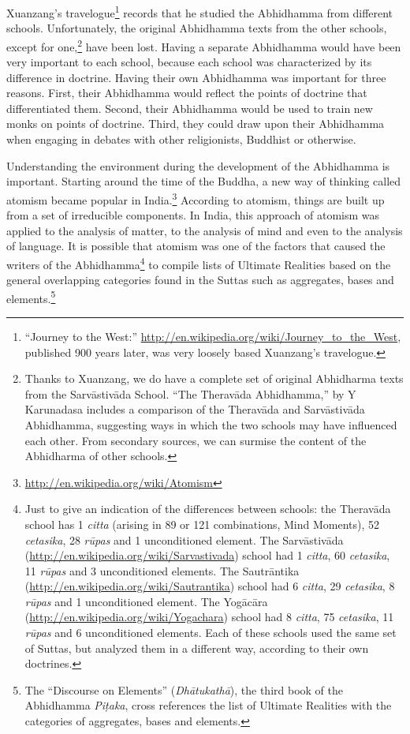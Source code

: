 Xuanzang’s travelogue\footnote{“Journey to the West:” \url{http://en.wikipedia.org/wiki/Journey_to_the_West}, published 900 years later, was very loosely based Xuanzang’s travelogue.} records that he studied the Abhidhamma from different schools. Unfortunately, the original Abhidhamma texts from the other schools, except for one,\footnote{Thanks to Xuanzang, we do have a complete set of original Abhidharma texts from the Sarvāstivāda School. “The Theravāda Abhidhamma,” by Y Karunadasa includes a comparison of the Theravāda and Sarvāstivāda Abhidhamma, suggesting ways in which the two schools may have influenced each other. From secondary sources, we can surmise the content of the Abhidharma of other schools.} have been lost. Having a separate Abhidhamma would have been very important to each school, because each school was characterized by its difference in doctrine. Having their own Abhidhamma was important for three reasons. First, their Abhidhamma would reflect the points of doctrine that differentiated them. Second, their Abhidhamma would be used to train new monks on points of doctrine. Third, they could draw upon their Abhidhamma when engaging in debates with other religionists, Buddhist or otherwise.

Understanding the environment during the development of the Abhidhamma is important. Starting around the time of the Buddha, a new way of thinking called atomism became popular in India.\footnote{\url{http://en.wikipedia.org/wiki/Atomism}} According to atomism, things are built up from a set of irreducible components. In India, this approach of atomism was applied to the analysis of matter, to the analysis of mind and even to the analysis of language. It is possible that atomism was one of the factors that caused the writers of the Abhidhamma\footnote{Just to give an indication of the differences between schools: the Theravāda school has 1 \textit{citta} (arising in 89 or 121 combinations, Mind Moments), 52 \textit{cetasika}, 28 \textit{rūpas} and 1 unconditioned element. The Sarvāstivāda (\url{http://en.wikipedia.org/wiki/Sarvastivada}) school had 1 \textit{citta}, 60 \textit{cetasika}, 11 \textit{rūpas} and 3 unconditioned elements. The Sautrāntika (\url{http://en.wikipedia.org/wiki/Sautrantika}) school had 6 \textit{citta}, 29 \textit{cetasika}, 8 \textit{rūpas} and 1 unconditioned element. The Yogācāra (\url{http://en.wikipedia.org/wiki/Yogachara}) school had 8 \textit{citta}, 75 \textit{cetasika}, 11 \textit{rūpas} and 6 unconditioned elements. Each of these schools used the same set of Suttas, but analyzed them in a different way, according to their own doctrines.} to compile lists of Ultimate Realities based on the general overlapping categories found in the Suttas such as aggregates, bases and elements.\footnote{The “Discourse on Elements” (\textit{Dhātukathā}), the third book of the Abhidhamma \textit{Piṭaka}, cross references the list of Ultimate Realities with the categories of aggregates, bases and elements.}

